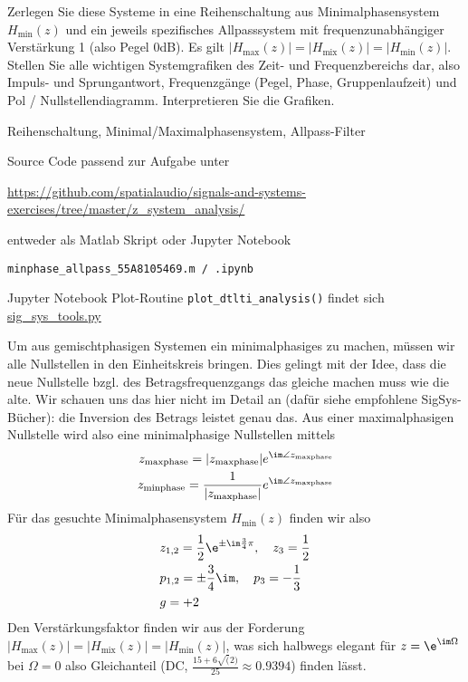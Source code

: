 Zerlegen Sie diese Systeme in eine Reihenschaltung aus Minimalphasensystem
$H_\mathrm{min}(z)$
und ein jeweils spezifisches Allpasssystem mit frequenzunabhängiger
Verstärkung 1 (also Pegel 0dB).
Es gilt $|H_\mathrm{max}(z)| = |H_\mathrm{mix}(z)| = |H_\mathrm{min}(z)|$.
%
Stellen Sie alle wichtigen Systemgrafiken des Zeit- und Frequenzbereichs dar,
also Impuls- und Sprungantwort, Frequenzgänge (Pegel, Phase, Gruppenlaufzeit)
und Pol / Nullstellendiagramm.
%
Interpretieren Sie die Grafiken.



\begin{Werkzeug}
Reihenschaltung, Minimal/Maximalphasensystem, Allpass-Filter

Source Code passend zur Aufgabe unter

\url{https://github.com/spatialaudio/signals-and-systems-exercises/tree/master/z_system_analysis/}

entweder als Matlab Skript oder Jupyter Notebook

\texttt{minphase\_allpass\_55A8105469.m / .ipynb}

Jupyter Notebook Plot-Routine \texttt{plot\_dtlti\_analysis()} findet sich
\url{sig_sys_tools.py}


\end{Werkzeug}
\begin{Ansatz}
Um aus gemischtphasigen Systemen ein minimalphasiges zu machen, müssen wir
alle Nullstellen in den Einheitskreis bringen. Dies gelingt mit der Idee, dass
die neue Nullstelle bzgl. des Betragsfrequenzgangs
das gleiche machen muss wie die alte.
Wir schauen uns das hier nicht im Detail an (dafür siehe empfohlene SigSys-Bücher):
die Inversion des Betrags leistet genau das. Aus einer maximalphasigen Nullstelle
wird also eine minimalphasige Nullstellen mittels
\begin{align}
z_\mathrm{maxphase} = |z_\mathrm{maxphase}| e^{\im\angle z_\mathrm{maxphase}}\\
 z_\mathrm{minphase} = \frac{1}{|z_\mathrm{maxphase}|} e^{\im\angle z_\mathrm{maxphase}}
\end{align}
%
Für das gesuchte Minimalphasensystem $H_\mathrm{min}(z)$ finden wir also
\begin{align}
&z_{1,2} = \frac{1}{2} \e^{\pm\im\frac{3}{4}\pi},\quad z_3 = \frac{1}{2}\\
&p_{1,2} = \pm\frac{3}{4}\im,\quad p_3 = -\frac{1}{3}\\
&g = +2
\end{align}
Den Verstärkungsfaktor finden wir aus der Forderung
$|H_\mathrm{max}(z)| = |H_\mathrm{mix}(z)| = |H_\mathrm{min}(z)|$, was
sich halbwegs elegant für $z=\e^{\im \Omega}$ bei $\Omega=0$ also Gleichanteil
(DC, $\frac{15+6\sqrt(2)}{25} \approx 0.9394$) finden lässt.
%
\end{Ansatz}
